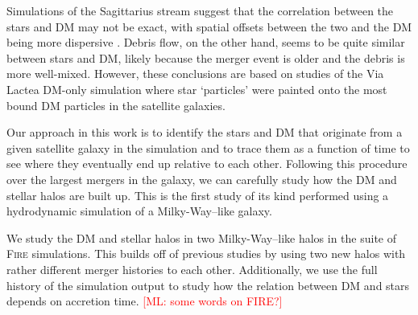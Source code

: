 \documentclass[twocolumn,preprintnumbers]{aastex6}
\def\ML#1{\textcolor{red}{[ML: #1]}}
\begin{document}
Simulations of the Sagittarius stream suggest that the correlation between the stars and DM may not be exact, with spatial offsets between the two and the DM being more dispersive \citep{2012JCAP...08..027P}.  Debris flow, on the other hand, seems to be quite similar between stars and DM, likely because the merger event is older and the debris is more well-mixed.  However, these conclusions are based on studies of the Via Lactea DM-only simulation where star `particles' were painted onto the most bound DM particles in the satellite galaxies.

Our approach in this work is to identify the stars and DM that originate from a given satellite galaxy in the simulation and to trace them as a function of time to see where they eventually end up relative to each other.  Following this procedure over the largest mergers in the galaxy, we can carefully study how the DM  and stellar halos are built up.  This is the first study of its kind performed using a hydrodynamic simulation of a Milky-Way--like galaxy.  

We study the DM and stellar halos in two Milky-Way--like halos in the suite of \textsc{Fire} simulations.  
This builds off of previous studies by using two new halos with rather different merger histories to each other.  Additionally, we use the full history of the simulation output to study how the relation between DM and stars depends on accretion time. \ML{some words on FIRE?}
\end{document}
